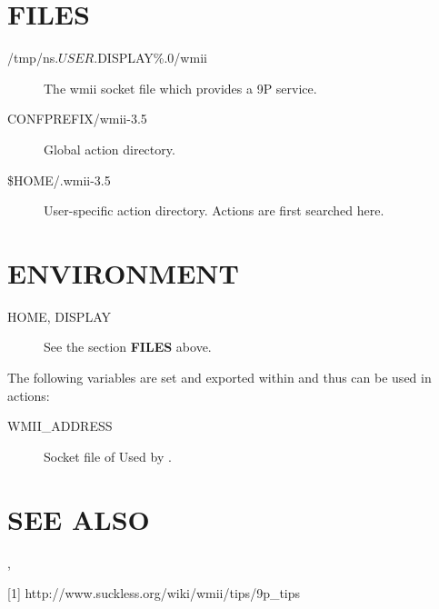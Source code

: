 \section{FILES}

\begin{description}
\item[/tmp/ns.$USER.${DISPLAY\%.0}/wmii] The wmii socket file
	which provides a 9P service.
\item[CONFPREFIX/wmii-3.5] Global action directory.
\item[\$HOME/.wmii-3.5] User-specific action directory.  Actions
	are first searched here.
\end{description}

\section{ENVIRONMENT}

\begin{description}
\item[HOME, DISPLAY] See the section \textbf{FILES} above.
\end{description}

The following variables are set and exported within  and
thus can be used in actions:

\begin{description}
\item[WMII\_ADDRESS] Socket file of Used by .
\end{description}

\section{SEE ALSO}
, 

[1] http://www.suckless.org/wiki/wmii/tips/9p\_tips

